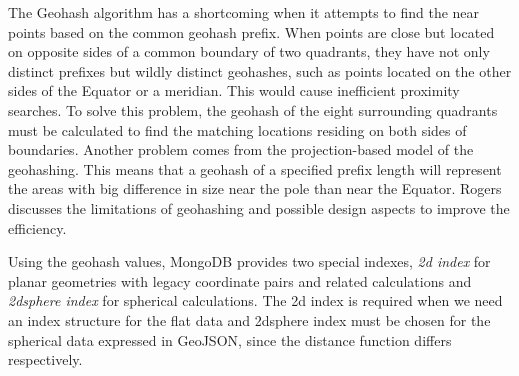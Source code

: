 \documentclass[a4paper,12pt]{article}
\begin{document}
The Geo\-hash algorithm has a shortcoming when it attempts to find the near points based on the common geo\-hash prefix. When points are close but located on opposite sides of a common boundary of two quadrants, they have not only distinct prefixes but wildly distinct geohashes, such as points located on the other sides of the Equator or a meridian. This would cause inefficient proximity searches. To solve this problem, the geohash of the eight surrounding quadrants must be calculated to find the matching locations residing on both sides of boundaries. 
Another problem comes from the projection-based model of the geohashing. This means that a geo\-hash of a specified prefix length will represent the areas with big difference in size near the pole than near the Equator. 
Rogers~\cite{www/geohash-limit} discusses the limitations of geohashing and possible design aspects to improve the efficiency.




Using the geohash values, MongoDB provides two special indexes, \textit{2d index} for planar geometries with legacy coordinate pairs and related calculations and \textit{2dsphere index} for spherical calculations. The 2d index is required when we need an index structure for the flat data and 
2dsphere index must be chosen for the spherical data expressed in GeoJSON, since the distance function differs respectively.
\end{document}
